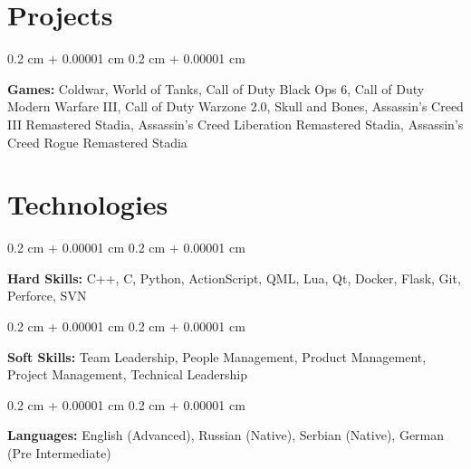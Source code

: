 \documentclass[10pt, letterpaper]{article}
\newenvironment{onecolentry}{
    \begin{adjustwidth}{
        0.2 cm + 0.00001 cm
    }{
        0.2 cm + 0.00001 cm
    }
}{
    \end{adjustwidth}
} %
\begin{document}
    
    \section{Projects}



        
        \begin{onecolentry}
            \textbf{Games:} Coldwar, World of Tanks, Call of Duty Black Ops 6, Call of Duty Modern Warfare III, Call of Duty Warzone 2.0, Skull and Bones, Assassin's Creed III Remastered Stadia, Assassin's Creed Liberation Remastered Stadia, Assassin's Creed Rogue Remastered Stadia
        \end{onecolentry}


    
    \section{Technologies}


        \begin{onecolentry}
            \textbf{Hard Skills:} C++, C, Python, ActionScript, QML, Lua, Qt, Docker, Flask, Git, Perforce, SVN
        \end{onecolentry}

        \vspace{0.2 cm}
        
        \begin{onecolentry}
            \textbf{Soft Skills:} Team Leadership, People Management, Product Management,  Project Management, Technical Leadership
        \end{onecolentry}

        \vspace{0.2 cm}

        \begin{onecolentry}
            \textbf{Languages:} English (Advanced), Russian (Native), Serbian (Native), German (Pre Intermediate)
        \end{onecolentry}


    
\end{document}
